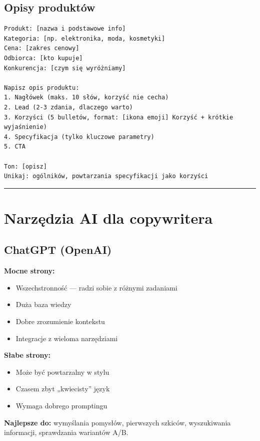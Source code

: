 \documentclass[
  12pt,
  a4paper,
  twoside,
  openright,
  12pt,
  DIV=12,
  BCOR=12mm]{scrbook}
\providecommand{\tightlist}{%
  \setlength{\itemsep}{0pt}\setlength{\parskip}{0pt}}\usepackage{longtable,booktabs,array}
\newcommand{\decoline}{%
  \begin{center}
    \textcolor{bordergray}{\rule{0.3\textwidth}{0.5pt}}
  \end{center}
}
\begin{document}
\subsection{Opisy produktów}\label{opisy-produktuxf3w}

\begin{verbatim}
Produkt: [nazwa i podstawowe info]
Kategoria: [np. elektronika, moda, kosmetyki]
Cena: [zakres cenowy]
Odbiorca: [kto kupuje]
Konkurencja: [czym się wyróżniamy]

Napisz opis produktu:
1. Nagłówek (maks. 10 słów, korzyść nie cecha)
2. Lead (2-3 zdania, dlaczego warto)
3. Korzyści (5 bulletów, format: [ikona emoji] Korzyść + krótkie wyjaśnienie)
4. Specyfikacja (tylko kluczowe parametry)
5. CTA

Ton: [opisz]
Unikaj: ogólników, powtarzania specyfikacji jako korzyści
\end{verbatim}

\decoline

\section{Narzędzia AI dla
copywritera}\label{narzux119dzia-ai-dla-copywritera}

\subsection{ChatGPT (OpenAI)}\label{chatgpt-openai}

\textbf{Mocne strony:}

\begin{itemize}
\tightlist
\item
  Wszechstronność --- radzi sobie z różnymi zadaniami
\item
  Duża baza wiedzy
\item
  Dobre zrozumienie kontekstu
\item
  Integracje z wieloma narzędziami
\end{itemize}

\textbf{Słabe strony:}

\begin{itemize}
\tightlist
\item
  Może być powtarzalny w stylu
\item
  Czasem zbyt „kwiecisty'' język
\item
  Wymaga dobrego promptingu
\end{itemize}

\textbf{Najlepsze do:} wymyślania pomysłów, pierwszych szkiców,
wyszukiwania informacji, sprawdzania wariantów A/B.
\end{document}
